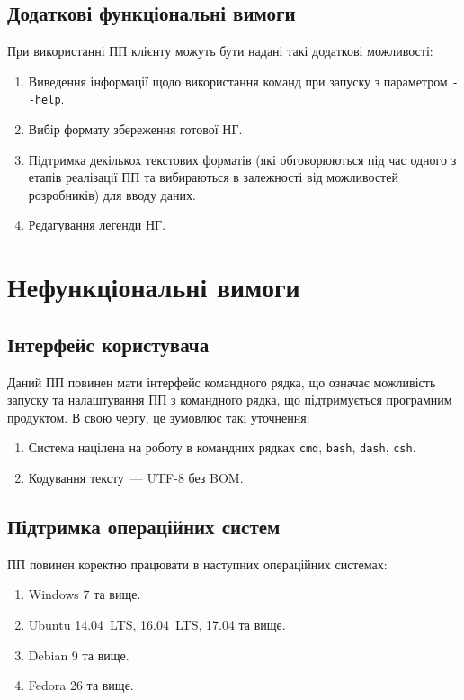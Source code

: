 \documentclass[a4paper,oneside,DIV=12,12pt]{scrartcl}
\newcommand{\cmdtoolname}[1]{\texttt{#1}}
\begin{document}
		\subsection{Додаткові функціональні вимоги}
			При використанні ПП клієнту можуть бути надані такі додаткові можливості:
			\begin{enumerate}
				\item Виведення інформації щодо використання команд при запуску з параметром \verb|--help|. 
				\item Вибір формату збереження готової НГ.
				\item Підтримка декількох текстових форматів (які обговорюються під час одного з етапів реалізації ПП та вибираються в залежності від можливостей розробників) для вводу даних.
				\item Редагування легенди НГ.
			\end{enumerate}

	\section{Нефункціональні вимоги}
		\subsection{Інтерфейс користувача}
			Даний ПП повинен мати інтерфейс командного рядка, що означає можливість запуску та налаштування ПП з командного рядка, що підтримується програмним продуктом. В свою чергу, це зумовлює такі уточнення:
			\begin{enumerate}
				\item Система націлена на роботу в командних рядках \cmdtoolname{cmd}, \cmdtoolname{bash}, \cmdtoolname{dash}, \cmdtoolname{csh}.
				\item Кодування тексту~— UTF-8 без BOM.
			\end{enumerate}

		\subsection{Підтримка операційних систем}

			ПП повинен коректно працювати в наступних операційних системах:
			\begin{enumerate}
				\item Windows 7 та вище.
				\item Ubuntu 14.04~LTS, 16.04~LTS, 17.04 та вище.
				\item Debian 9 та вище.
				\item Fedora 26 та вище.
			\end{enumerate}
			
\end{document}
